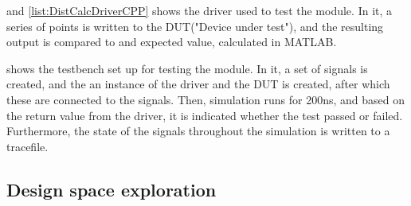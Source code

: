 



 and \cref{list:DistCalcDriverCPP} shows the driver used to test the module. In it, a series of points is written to the DUT("Device under test"), and the resulting output is compared to and expected value, calculated in MATLAB.

 shows the testbench set up for testing the module. In it, a set of signals is created, and the an instance of the driver and the DUT is created, after which these are connected to the signals. Then, simulation runs for 200ns, and based on the return value from the driver, it is indicated whether the test passed or failed. Furthermore, the state of the signals throughout the simulation is written to a tracefile.









\subsection{Design space exploration}